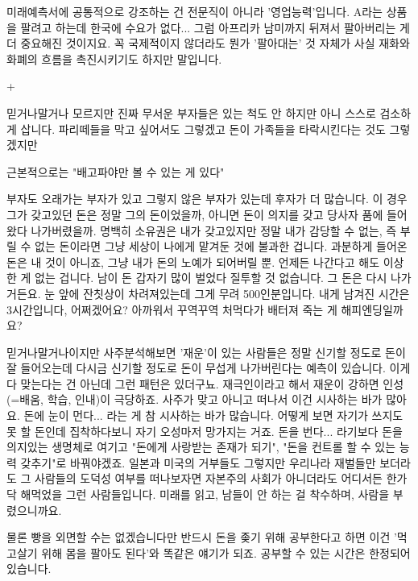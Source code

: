 미래예측서에 공통적으로 강조하는 건 전문직이 아니라 '영업능력'입니다.
A라는 상품을 팔려고 하는데 한국에 수요가 없다... 그럼 아프리카 남미까지 뒤져서 팔아버리는 게 더 중요해진 것이지요.
꼭 국제적이지 않더라도 뭔가 '팔아대는' 것 자체가 사실 재화와 화폐의 흐름을 촉진시키기도 하지만 말입니다.
\vspace{5mm}

+
\vspace{5mm}

믿거나말거나 모르지만 진짜 무서운 부자들은 있는 척도 안 하지만 아니 스스로 검소하게 삽니다.
파리떼들을 막고 싶어서도 그렇겠고 돈이 가족들을 타락시킨다는 것도 그렇겠지만
\vspace{5mm}

근본적으로는 "배고파야만 볼 수 있는 게 있다"
\vspace{5mm}

부자도 오래가는 부자가 있고 그렇지 않은 부자가 있는데 후자가 더 많습니다.
이 경우 그가 갖고있던 돈은 정말 그의 돈이었을까, 아니면 돈이 의지를 갖고 당사자 품에 들어왔다 나가버렸을까.
명백히 소유권은 내가 갖고있지만 정말 내가 감당할 수 없는, 즉 부릴 수 없는 돈이라면 그냥 세상이 나에게 맡겨둔 것에 불과한 겁니다.
과분하게 들어온 돈은 내 것이 아니죠, 그냥 내가 돈의 노예가 되어버릴 뿐. 언제든 나간다고 해도 이상한 게 없는 겁니다.
남이 돈 갑자기 많이 벌었다 질투할 것 없습니다. 그 돈은 다시 나가거든요.
눈 앞에 잔칫상이 차려져있는데 그게 무려 500인분입니다. 내게 남겨진 시간은 3시간입니다, 어쩌겠어요?
아까워서 꾸역꾸역 처먹다가 배터져 죽는 게 해피엔딩일까요?
\vspace{5mm}

믿거나말거나이지만 사주분석해보면 '재운'이 있는 사람들은 정말 신기할 정도로 돈이 잘 들어오는데
다시금 신기할 정도로 돈이 무섭게 나가버린다는 예측이 있습니다. 이게 다 맞는다는 건 아닌데 그런 패턴은 있더구뇨.
재극인이라고 해서 재운이 강하면 인성(=배움, 학습, 인내)이 극당하죠. 사주가 맞고 아니고 떠나서 이건 시사하는 바가 많아요.
돈에 눈이 먼다... 라는 게 참 시사하는 바가 많습니다. 어떻게 보면 자기가 쓰지도 못 할 돈인데 집착하다보니 자기 오성마저 망가지는 거죠.
돈을 번다... 라기보다 돈을 의지있는 생명체로 여기고 "돈에게 사랑받는 존재가 되기", "돈을 컨트롤 할 수 있는 능력 갖추기"로 바꿔야겠죠.
일본과 미국의 거부들도 그렇지만 우리나라 재벌들만 보더라도 그 사람들의 도덕성 여부를 떠나보자면
자본주의 사회가 아니더라도 어디서든 한가닥 해먹었을 그런 사람들입니다. 미래를 읽고, 남들이 안 하는 걸 착수하며, 사람을 부렸으니까요.
\vspace{5mm}

물론 빵을 외면할 수는 없겠습니다만 반드시 돈을 좆기 위해 공부한다고 하면 이건 '먹고살기 위해 몸을 팔아도 된다'와 똑같은 얘기가 되죠.
공부할 수 있는 시간은 한정되어 있습니다.
\vspace{5mm}





